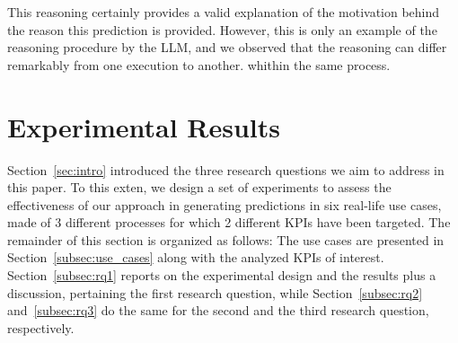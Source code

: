 \documentclass[manuscript,screen,review]{acmart}
\begin{document}
This reasoning certainly provides a valid explanation of the motivation behind the reason this prediction is provided. However, this is only an example of the reasoning procedure by the LLM, and we observed that the reasoning can differ remarkably from one execution to another. whithin the same process.%




\section{Experimental Results}\label{sec:exps}

Section~\ref{sec:intro} introduced the three research questions we aim to address in this paper. To this exten, we design a set of experiments to assess the effectiveness of our approach in generating predictions in six real-life use cases, made of 3 different processes for which 2 different KPIs have been targeted. 
The remainder of this section is organized as follows: The use cases are presented in Section~\ref{subsec:use_cases} along with the analyzed KPIs of interest. Section~\ref{subsec:rq1} reports on the experimental design and the results plus a discussion, pertaining the first research question, while Section~\ref{subsec:rq2} and~\ref{subsec:rq3} do the same for the second and the third research question, respectively. 
\end{document}
